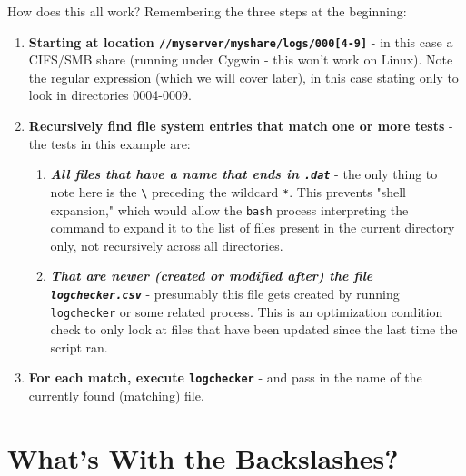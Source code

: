 \documentclass[10pt,american,]{book}
\newenvironment{Shaded}{\begin{snugshade}}{\end{snugshade}}
\newcommand{\KeywordTok}[1]{\textcolor[rgb]{0.13,0.29,0.53}{\textbf{{#1}}}}
\newcommand{\DataTypeTok}[1]{\textcolor[rgb]{0.13,0.29,0.53}{{#1}}}
\newcommand{\NormalTok}[1]{{#1}}
\numberwithin{figure}{chapter}
\renewcommand{\KeywordTok}[1]{{#1}}
\renewcommand{\DataTypeTok}[1]{{#1}}
\renewcommand{\NormalTok}[1]{{#1}}
\begin{document}
\begin{Shaded}
\end{Shaded}

How does this all work? Remembering the three steps at the beginning:

\begin{enumerate}
\def\labelenumi{\arabic{enumi}.}
\item
  \textbf{Starting at location
  \texttt{//myserver/myshare/logs/000{[}4-9{]}}} - in this case a
  CIFS/SMB share (running under Cygwin - this won't work on Linux). Note
  the regular expression (which we will cover later), in this case
  stating only to look in directories 0004-0009.
\item
  \textbf{Recursively find file system entries that match one or more
  tests} - the tests in this example are:

  \begin{enumerate}
  \def\labelenumii{\alph{enumii}.}
  \item
    \textbf{\emph{All files that have a name that ends in
    \texttt{.dat}}} - the only thing to note here is the
    \texttt{\textbackslash{}} preceding the wildcard \texttt{*}. This
    prevents "shell expansion," which would allow the \texttt{bash}
    process interpreting the command to expand it to the list of files
    present in the current directory only, not recursively across all
    directories.
  \item
    \textbf{\emph{That are newer (created or modified after) the file
    \texttt{logchecker.csv}}} - presumably this file gets created by
    running \texttt{logchecker} or some related process. This is an
    optimization condition check to only look at files that have been
    updated since the last time the script ran.
  \end{enumerate}
\item
  \textbf{For each match, execute \texttt{logchecker}} - and pass in the
  name of the currently found (matching) file.
\end{enumerate}

\section*{What's With the
Backslashes?}\label{whats-with-the-backslashes}
\end{document}
